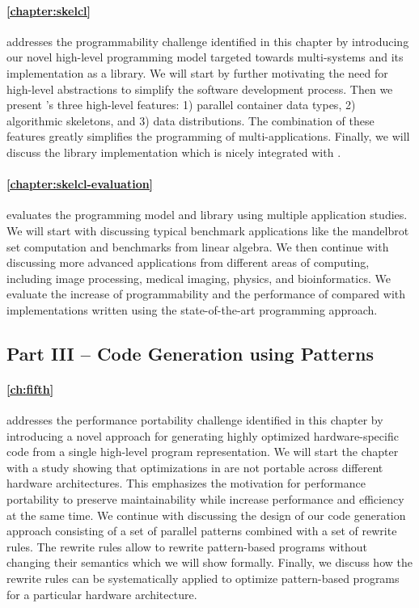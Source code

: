 \paragraph{\autoref{chapter:skelcl}} addresses the programmability challenge identified in this chapter by introducing our novel \SkelCL high-level programming model targeted towards multi-\GPU systems and its implementation as a \Cpp library.
We will start by further motivating the need for high-level abstractions to simplify the software development process.
Then we present \SkelCL's three high-level features:
1) parallel container data types, 2) algorithmic skeletons, and 3) data distributions.
The combination of these features greatly simplifies the programming of multi-\GPU applications.
Finally, we will discuss the \SkelCL library implementation which is nicely integrated with \Cpp.

\paragraph{\autoref{chapter:skelcl-evaluation}} evaluates the \SkelCL programming model and library using multiple application studies.
We will start with discussing typical benchmark applications like the mandelbrot set computation and benchmarks from linear algebra.
We then continue with discussing more advanced applications from different areas of computing, including image processing, medical imaging, physics, and bioinformatics.
We evaluate the increase of programmability and the performance of \SkelCL compared with implementations written using the state-of-the-art \OpenCL programming approach.


\subsection*{Part III -- Code Generation using Patterns}

\paragraph{\autoref{ch:fifth}} addresses the performance portability challenge identified in this chapter by introducing a novel approach for generating highly optimized hardware-specific code from a single high-level program representation.
We will start the chapter with a study showing that optimizations in \OpenCL are not portable across different hardware architectures.
This emphasizes the motivation for performance portability to preserve maintainability while increase performance and efficiency at the same time.
We continue with discussing the design of our code generation approach consisting of a set of parallel patterns combined with a set of rewrite rules.
The rewrite rules allow to rewrite pattern-based programs without changing their semantics which we will show formally.
Finally, we discuss how the rewrite rules can be systematically applied to optimize pattern-based programs for a particular hardware architecture.

